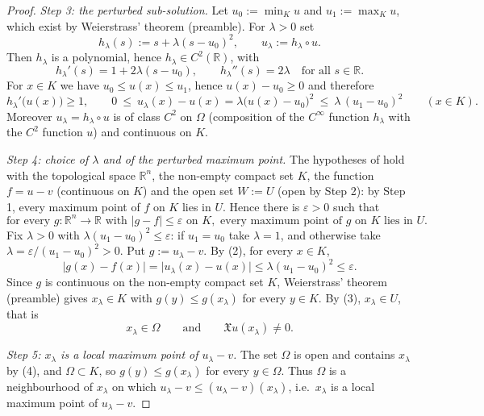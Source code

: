 \begin{proof}
\emph{Step 3: the perturbed sub-solution.} Let $u_0:=\min_Ku$ and $u_1:=\max_Ku$, which exist by
Weierstrass' theorem (preamble). For $\lambda>0$ set
$$h_\lambda(s):=s+\lambda(s-u_0)^2,\qquad u_\lambda:=h_\lambda\circ u .$$
Then $h_\lambda$ is a polynomial, hence $h_\lambda\in C^2(\mathbb{R})$, with
$$h_\lambda'(s)=1+2\lambda(s-u_0),\qquad h_\lambda''(s)=2\lambda\quad\text{for all }
s\in\mathbb{R}.$$
For $x\in K$ we have $u_0\leq u(x)\leq u_1$, hence $u(x)-u_0\geq0$ and therefore
\begin{equation*}h_\lambda'\big(u(x)\big)\geq1,\qquad
0\ \leq\ u_\lambda(x)-u(x)=\lambda\big(u(x)-u_0\big)^2\ \leq\ \lambda\,(u_1-u_0)^2
\qquad(x\in K). \tag{2}\end{equation*}
Moreover $u_\lambda=h_\lambda\circ u$ is of class $C^2$ on $\Omega$ (composition of the $C^\infty$
function $h_\lambda$ with the $C^2$ function $u$) and continuous on $K$.

\emph{Step 4: choice of $\lambda$ and of the perturbed maximum point.} The hypotheses of
 hold with the topological space $\mathbb{R}^n$, the non-empty compact
set $K$, the function $f=u-v$ (continuous on $K$) and the open set $W:=U$ (open by Step 2): by
Step 1, every maximum point of $f$ on $K$ lies in $U$. Hence there is $\varepsilon>0$ such that
\begin{equation*}\text{for every }g:\mathbb{R}^n\to\mathbb{R}\text{ with }|g-f|\leq\varepsilon\text{ on }K,
\text{ every maximum point of }g\text{ on }K\text{ lies in }U. \tag{3}\end{equation*}
Fix $\lambda>0$ with $\lambda(u_1-u_0)^2\leq\varepsilon$: if $u_1=u_0$ take $\lambda=1$, and
otherwise take $\lambda=\varepsilon/(u_1-u_0)^2>0$. Put $g:=u_\lambda-v$. By (2), for every
$x\in K$,
$$|g(x)-f(x)|=\big|u_\lambda(x)-u(x)\big|\leq\lambda(u_1-u_0)^2\leq\varepsilon .$$
Since $g$ is continuous on the non-empty compact set $K$, Weierstrass' theorem (preamble) gives
$x_\lambda\in K$ with $g(y)\leq g(x_\lambda)$ for every $y\in K$. By (3), $x_\lambda\in U$, that is
\begin{equation*}x_\lambda\in\Omega\qquad\text{and}\qquad\mathfrak{X}u(x_\lambda)\neq0. \tag{4}\end{equation*}

\emph{Step 5: $x_\lambda$ is a local maximum point of $u_\lambda-v$.} The set $\Omega$ is open and
contains $x_\lambda$ by (4), and $\Omega\subset K$, so $g(y)\leq g(x_\lambda)$ for every
$y\in\Omega$. Thus $\Omega$ is a neighbourhood of $x_\lambda$ on which
$u_\lambda-v\leq(u_\lambda-v)(x_\lambda)$, i.e.\ $x_\lambda$ is a local maximum point of
$u_\lambda-v$.


\end{proof}
